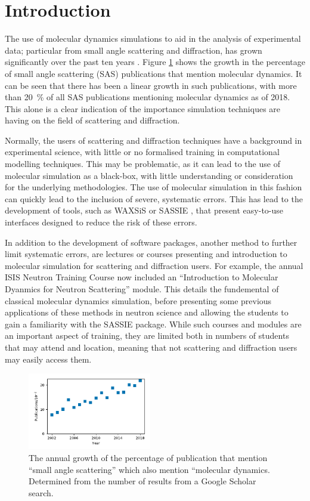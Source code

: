 \documentclass[amsmath,amssymb,twocolumn,superscriptaddress]{revtex4-1}
\begin{document}
\section{Introduction}

The use of molecular dynamics simulations to aid in the analysis of experimental data; particular from small angle scattering and diffraction, has grown significantly over the past ten years \cite{Pan2012,Boldon2015,Hub2018,Ivanovic2018,East2016,Wall2014,Wall2018,Satoh2015}.
Figure \ref{fig:growth} shows the growth in the percentage of small angle scattering (SAS) publications that mention molecular dynamics.
It can be seen that there has been a linear growth in such publications, with more than \SI{20}{\percent} of all SAS publications mentioning molecular dynamics as of 2018.
This alone is a clear indication of the importance simulation techniques are having on the field of scattering and diffraction.

Normally, the users of scattering and diffraction techniques have a background in experimental science, with little or no formalised training in computational modelling techniques.
This may be problematic, as it can lead to the use of molecular simulation as a black-box, with little understanding or consideration for the underlying methodologies.
The use of molecular simulation in this fashion can quickly lead to the inclusion of severe, systematic errors.
This has lead to the development of tools, such as WAXSiS or SASSIE \cite{Chen2014,Knight2015,Perkins2016}, that present easy-to-use interfaces designed to reduce the risk of these errors.

In addition to the development of software packages, another method to further limit systematic errors, are lectures or courses presenting and introduction to molecular simulation for scattering and diffraction users.
For example, the annual ISIS Neutron Training Course now included an ``Introduction to Molecular Dyanmics for Neutron Scattering'' module.
This details the fundemental of classical molecular dynamics simulation, before presenting some previous applications of these methods in neutron science and allowing the students to gain a familiarity with the SASSIE package.
While such courses and modules are an important aspect of training, they are limited both in numbers of students that may attend and location, meaning that not scattering and diffraction users may easily access them.
%
\begin{figure}
\label{fig:growth}
\includegraphics[width=0.48\textwidth]{figures/chem_data_py.pdf}
\caption{The annual growth of the percentage of publication that mention ``small angle scattering'' which also mention ``molecular dynamics. Determined from the number of results from a Google Scholar search.}
\end{figure}
%
\end{document}
